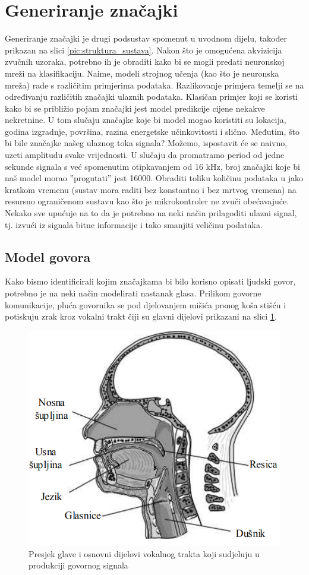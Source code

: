 \section{Generiranje značajki}
\label{sec:gen}

Generiranje značajki je drugi podsustav spomenut u uvodnom dijelu, također
prikazan na slici \ref{pic:struktura_sustava}. Nakon što je omogućena akvizicija
zvučnih uzoraka, potrebno ih je obraditi kako bi se mogli predati neuronskoj mreži 
na klasifikaciju. Naime, modeli strojnog učenja (kao što je neuronska mreža) rade
s različitim primjerima podataka. Razlikovanje primjera temelji se na određivanju
različitih značajki ulaznih podataka. Klasičan primjer koji se koristi kako bi se 
približio pojam značajki jest model predikcije cijene nekakve
nekretnine. U tom slučaju značajke koje bi model mogao koristiti su lokacija,
godina izgradnje, površina, razina energetske učinkovitosti i slično. Međutim, što
bi bile značajke našeg ulaznog toka signala? Možemo, ispostavit će se naivno, uzeti
amplitudu svake vrijednosti. U slučaju da promatramo period od jedne sekunde
signala s već spomenutim otipkavanjem od 16 kHz, broj značajki koje bi naš model
morao ”progutati” jest 16000. Obraditi toliku količinu podataka u jako kratkom
vremenu (sustav mora raditi bez konstantno i bez mrtvog vremena) na resursno
ograničenom sustavu kao što je mikrokontroler ne zvuči obećavajuće. Nekako sve 
upućuje na to da je potrebno na neki način prilagoditi ulazni signal, tj. izvući
iz signala bitne informacije i tako smanjiti veličinu podataka. 

\subsection{Model govora}
\label{sec:speech}

Kako bismo identificirali kojim značajkama bi bilo korisno opisati ljudski govor,
potrebno je na neki način modelirati nastanak glasa. Prilikom govorne komunikacije,
pluća govornika se pod djelovanjem mišića prsnog koša stišću i potiskuju zrak kroz
vokalni trakt čiji su glavni dijelovi prikazani na slici \ref{pic:glas}.

\begin{figure}[htb]
    \centering
    \includegraphics[width=0.6\linewidth]{Chapters/struktura_sustava/generiranje_znacajki/glas.png} 
    \caption{Presjek glave i osnovni dijelovi vokalnog trakta koji sudjeluju u produkciji govornog signala \cite{petrinovic2002}}
    \label{pic:glas}
\end{figure}

